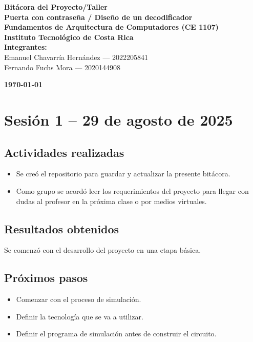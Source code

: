\documentclass[12pt,letterpaper]{article}
\begin{document}
\begin{center}
    \textbf{\LARGE{Bitácora del Proyecto/Taller}} \\[6mm]
    \textbf{\large{Puerta con contraseña / Diseño de un decodificador}} \\[4mm]
    \textbf{\large{Fundamentos de Arquitectura de Computadores (CE 1107)}} \\[4mm]
    \textbf{\large{Instituto Tecnológico de Costa Rica}} \\[6mm]

    \textbf{Integrantes:} \\[4mm]
    Emanuel Chavarría Hernández — 2022205841 \\[2mm]
    Fernando Fuchs Mora — 2020144908

    \textbf{\today}\\[8mm]
\end{center}



\section{Sesión 1 -- 29 de agosto de 2025}
\subsection*{Actividades realizadas}
\begin{itemize}
    \item Se creó el repositorio para guardar y actualizar la presente bitácora.
    \item Como grupo se acordó leer los requerimientos del proyecto para llegar con dudas al profesor en la próxima clase o por medios virtuales.
\end{itemize}

\subsection*{Resultados obtenidos}
Se comenzó con el desarrollo del proyecto en una etapa básica.

\subsection*{Próximos pasos}
\begin{itemize}
    \item Comenzar con el proceso de simulación.
    \item Definir la tecnología que se va a utilizar.
    \item Definir el programa de simulación antes de construir el circuito.
\end{itemize}
\end{document}
